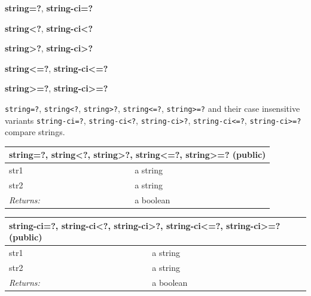 \documentclass[twoside,9pt]{report}
\begin{document}
\textbf{string=?}, \textbf{string-ci=?}


\textbf{string<?}, \textbf{string-ci<?}


\textbf{string>?}, \textbf{string-ci>?}


\textbf{string<=?}, \textbf{string-ci<=?}


\textbf{string>=?}, \textbf{string-ci>=?}


\texttt{string=?}, \texttt{string<?}, \texttt{string>?}, \texttt{string<=?}, \texttt{string>=?} and their case insensitive variants \texttt{string-ci=?}, \texttt{string-ci<?}, \texttt{string-ci>?}, \texttt{string-ci<=?}, \texttt{string-ci>=?} compare strings.

\begin{tabular}{ |l l| }
\hline
\multicolumn{2}{|l|}{string=?, string<?, string>?, string<=?, string>=? (public)} \\
\hline
str1 & a string \\
str2 & a string \\
\textit{Returns:} & a boolean \\
\hline
\end{tabular}

\begin{tabular}{ |l l| }
\hline
\multicolumn{2}{|l|}{string-ci=?, string-ci<?, string-ci>?, string-ci<=?, string-ci>=? (public)} \\
\hline
str1 & a string \\
str2 & a string \\
\textit{Returns:} & a boolean \\
\hline
\end{tabular}
\end{document}
